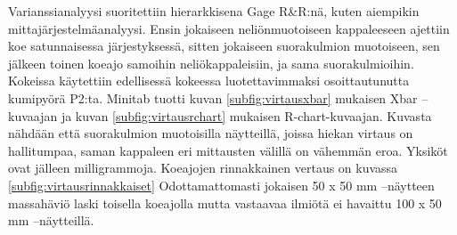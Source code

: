 \documentclass[12pt,a4paper,finnish]{tutthesis}
\begin{document}
Varianssianalyysi suoritettiin hierarkkisena Gage R\&R:nä, kuten aiempikin mittajärjestelmäanalyysi. Ensin jokaiseen neliönmuotoiseen kappaleeseen ajettiin koe satunnaisessa järjestyksessä, sitten jokaiseen suorakulmion muotoiseen, sen jälkeen toinen koeajo samoihin neliökappaleisiin, ja sama suorakulmioihin. Kokeissa käytettiin edellisessä kokeessa luotettavimmaksi osoittautunutta kumipyörä P2:ta. Minitab tuotti
kuvan \ref{subfig:virtausxbar} mukaisen Xbar –kuvaajan ja kuvan \ref{subfig:virtausrchart} mukaisen R-chart-kuvaajan.
Kuvasta nähdään että suorakulmion muotoisilla näytteillä, joissa hiekan virtaus on hallitumpaa, saman kappaleen eri mittausten välillä on vähemmän eroa. Yksiköt ovat jälleen milligrammoja.
Koeajojen rinnakkainen vertaus on kuvassa \ref{subfig:virtausrinnakkaiset}
Odottamattomasti jokaisen 50 x 50 mm –näytteen massahäviö laski toisella koeajolla mutta vastaavaa ilmiötä ei havaittu 100 x 50 mm –näytteillä.
\end{document}
